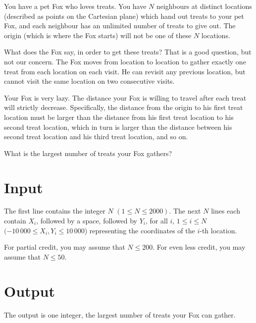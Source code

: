
You have a pet Fox who loves treats. You have $N$ neighbours at distinct locations (described as points on the Cartesian plane) which hand out treats to your pet Fox, and each neighbour has an unlimited number of treats to give out. The origin (which is where the Fox starts) will not be one of these $N$ locations.

What does the Fox say, in order to get these treats? That is a good question, but not our concern. The Fox moves from location to location to gather exactly one treat from each location on each visit. He can revisit any previous location, but cannot visit the same location on two consecutive visits.

Your Fox is very lazy. The distance your Fox is willing to travel after each treat will strictly decrease. Specifically, the distance from the origin to his first treat location must be larger than the distance from his first treat location to his second treat location, which in turn is larger than the distance between his second treat location and his third treat location, and so on.

What is the largest number of treats your Fox gathers?

\section*{Input}
The first line contains the integer $N$ $(1 \leq N \leq 2000)$. The next $N$ lines each contain $X_i$,
followed by a space, followed by $Y_i$, for all $i$, $1 \leq i \leq N$ $(-10\,000 \leq X_i,Y_i \leq
10\,000$) representing the coordinates of the $i$-th location.

For partial credit, you may assume that $N \leq 200$. For even less credit, you may assume that $N\leq 50$.


\section*{Output}
The output is one integer, the largest number of treats your Fox can gather.
